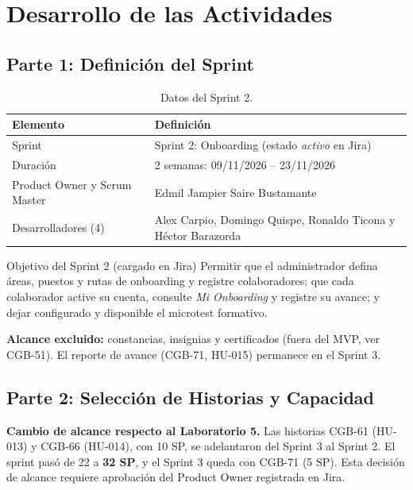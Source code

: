 \documentclass[11pt,a4paper]{article}
\begin{document}
\section{Desarrollo de las Actividades}

\subsection{Parte 1: Definición del Sprint}

\begin{table}[H]
\centering
\begin{tabularx}{\textwidth}{l X}
\toprule
\textbf{Elemento} & \textbf{Definición} \\
\midrule
Sprint & Sprint 2: Onboarding (estado \textit{activo} en Jira) \\
Duración & 2 semanas: 09/11/2026 -- 23/11/2026 \\
Product Owner y Scrum Master & Edmil Jampier Saire Bustamante \\
Desarrolladores (4) & Alex Carpio, Domingo Quispe, Ronaldo Ticona y Héctor Barazorda \\
\bottomrule
\end{tabularx}
\caption{Datos del Sprint 2.}
\end{table}

\begin{infobox}{Objetivo del Sprint 2 (cargado en Jira)}
Permitir que el administrador defina áreas, puestos y rutas de onboarding y registre colaboradores; que cada colaborador active su cuenta, consulte \textit{Mi Onboarding} y registre su avance; y dejar configurado y disponible el microtest formativo.
\end{infobox}

\textbf{Alcance excluido:} constancias, insignias y certificados (fuera del MVP, ver CGB-51). El reporte de avance (CGB-71, HU-015) permanece en el Sprint 3.

\subsection{Parte 2: Selección de Historias y Capacidad}

\textbf{Cambio de alcance respecto al Laboratorio 5.} Las historias CGB-61 (HU-013) y CGB-66 (HU-014), con 10 SP, se adelantaron del Sprint 3 al Sprint 2. El sprint pasó de 22 a \textbf{32 SP}, y el Sprint 3 queda con CGB-71 (5 SP). Esta decisión de alcance requiere aprobación del Product Owner registrada en Jira.
\end{document}
